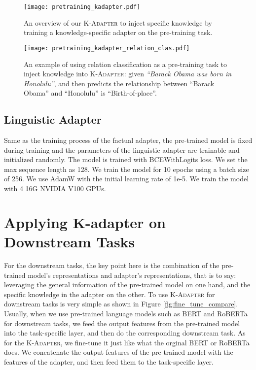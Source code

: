 \documentclass[11pt,a4paper]{article}
\begin{document}
\begin{figure*}[h]
    \centering
\texttt{[image: pretraining\_kadapter.pdf]}
    \caption{An overview of our \textsc{K-Adapter} to inject specific knowledge by training a knowledge-specific adapter on the pre-training task.}
    \label{fig:kadapter_strucutre_pretraining}
\end{figure*}

\begin{figure*}[h]
    \centering
\texttt{[image: pretraining\_kadapter\_relation\_clas.pdf]}
    \caption{An example of using relation classification as a pre-training task to inject knowledge into \textsc{K-Adapter}: given \textit{ ``Barack Obama was born in Honolulu''}, and then predicts the relationship between ``Barack Obama'' and ``Honolulu'' is ``Birth-of-place''.}
    \label{fig:pretraining_kadapter_relation_clas}
\end{figure*}

\subsection{Linguistic Adapter}
Same as the training process of the factual adapter, the pre-trained model is fixed during training and the parameters of the linguistic adapter are trainable and initialized randomly. The model is trained with BCEWithLogits loss. We set the max sequence length as 128. We train the model for 10 epochs using a batch size of 256. We use AdamW with the initial learning rate of 1e-5. We train the model with 4 16G NVIDIA V100 GPUs.                        
\section{Applying K-adapter on Downstream Tasks}
For the downstream tasks, the key point here is the combination of the pre-trained model's representations and adapter's representations, that is to say: leveraging the general information of the pre-trained model on one hand, and the specific knowledge in the adapter on the other.
To use \textsc{K-Adapter} for downstream tasks is very simple as shown in Figure \ref{fig:fine_tune_compare}. Usually, when we use pre-trained language models such as BERT and RoBERTa for downstream tasks, we feed the output features from the pre-trained model into the task-specific layer, and then do the corresponding downstream task.
As for the \textsc{K-Adapter}, we fine-tune it just like what the orginal BERT or RoBERTa does. We concatenate the output features of the pre-trained model with the features of the adapter, and then feed them to the task-specific layer.
\end{document}
